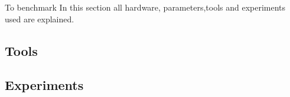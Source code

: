 To benchmark In this section all hardware, parameters,tools and experiments used are explained.  

\subsection{Tools}


\subsection{Experiments}


